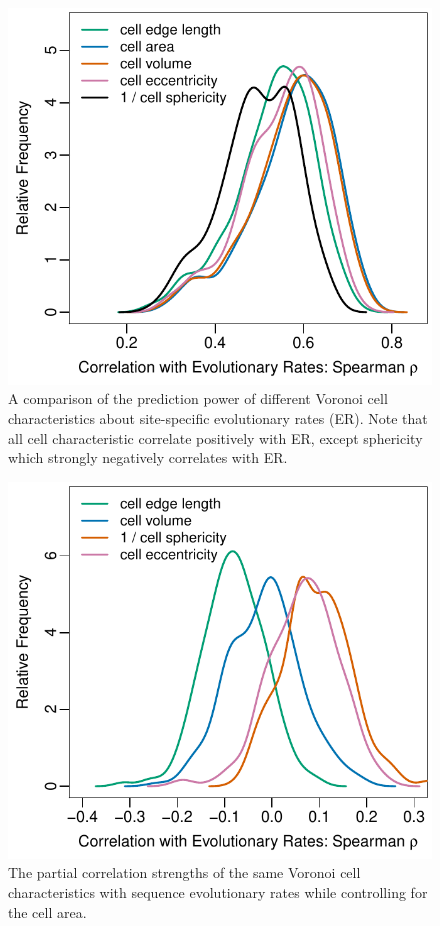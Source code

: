 \documentclass[11pt]{article}
\begin{document}
    \begin{figure}
        \begin{center}
        \includegraphics[width=5.5in]{best_voronoi_predictors_of_ER.pdf}
        \end{center}
        \caption{ A comparison of the prediction power of different Voronoi cell characteristics about site-specific evolutionary rates (ER). Note that all cell characteristic correlate positively with ER, except sphericity which strongly negatively correlates with ER.}
        \label{fig:voronoi_ER}
    \end{figure}

    \begin{figure}
        \begin{center}
        \includegraphics[width=5.5in]{best_voronoi_predictors_of_ER_given_area.pdf}
        \end{center}
        \caption{The partial correlation strengths of the same Voronoi cell characteristics with sequence evolutionary rates while controlling for the cell area.}
        \label{fig:voronoi_ER_cond}
    \end{figure}
\end{document}
